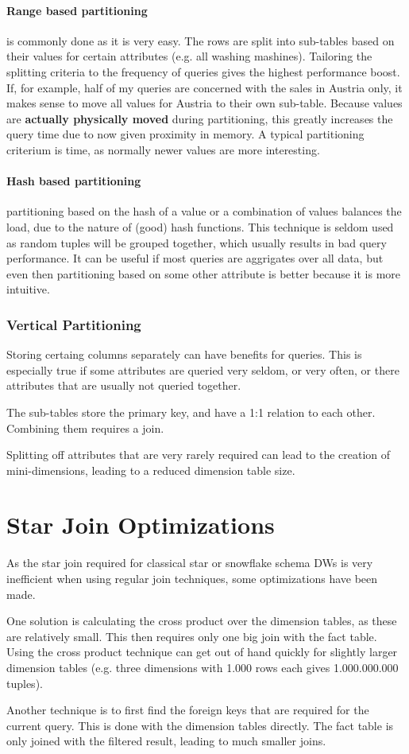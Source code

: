 \documentclass{article}
\begin{document}
\paragraph{Range based partitioning} is commonly done as it is very easy.
The rows are split into sub-tables based on their values for certain attributes (e.g. all washing mashines).
Tailoring the splitting criteria to the frequency of queries gives the highest performance boost.
If, for example, half of my queries are concerned with the sales in Austria only, it makes sense to move all values for Austria to their own sub-table.
Because values are \textbf{actually physically moved} during partitioning, this greatly increases the query time due to now given proximity in memory.
A typical partitioning criterium is time, as normally newer values are more interesting.

\paragraph{Hash based partitioning} partitioning based on the hash of a value or a combination of values balances the load, due to the nature of (good) hash functions.
This technique is seldom used as random tuples will be grouped together, which usually results in bad query performance.
It can be useful if most queries are aggrigates over all data, but even then partitioning based on some other attribute is better because it is more intuitive.

\subsubsection{Vertical Partitioning}
Storing certaing columns separately can have benefits for queries.
This is especially true if some attributes are queried very seldom, or very often, or there attributes that are usually not queried together.

The sub-tables store the primary key, and have a 1:1 relation to each other.
Combining them requires a join.

Splitting off attributes that are very rarely required can lead to the creation of mini-dimensions, leading to a reduced dimension table size.

\section{Star Join Optimizations}
As the star join required for classical star or snowflake schema DWs is very inefficient when using regular join techniques, some optimizations have been made.

One solution is calculating the cross product over the dimension tables, as these are relatively small.
This then requires only one big join with the fact table.
Using the cross product technique can get out of hand quickly for slightly larger dimension tables (e.g. three dimensions with 1.000 rows each gives 1.000.000.000 tuples).

Another technique is to first find the foreign keys that are required for the current query.
This is done with the dimension tables directly.
The fact table is only joined with the filtered result, leading to much smaller joins.
\end{document}
